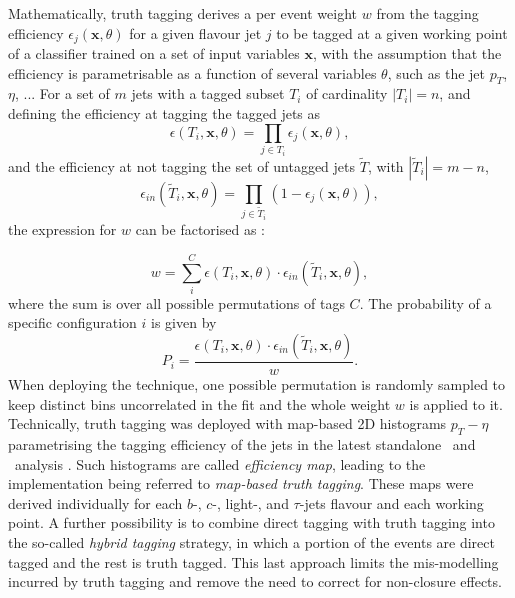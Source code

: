 Mathematically, truth tagging derives a per event weight $w$ from the tagging efficiency $\epsilon_j(\textbf{x}, \theta)$ for a given flavour jet $j$ to be tagged at a given working point of a classifier trained on a set of input variables $\textbf{x}$, with the assumption that the efficiency is parametrisable as a function of several variables $\theta$, such as the jet $p_T$, $\eta$, ... For a set of $m$ jets with a tagged subset $T_i$ of cardinality $|T_i| = n$, and defining the efficiency at tagging the tagged jets as \[\epsilon(T_i,\textbf{x},\theta) = \prod_{j\in T_i} \epsilon_j(\textbf{x},\theta),\] and the efficiency at not tagging the set of untagged jets $\tilde{T}$, with $|\tilde{T}_i| = m-n$, \[ \epsilon_{in}(\tilde{T}_i,\textbf{x}, \theta) = \prod_{j\in \tilde{T}_i} (1-\epsilon_j(\textbf{x}, \theta)),\] the expression for $w$ can be factorised as \cite{ATL-PHYS-PUB-2022-041}: 

\begin{equation}
  \label{eq:truthtagging1}
      w = \sum_i^C \epsilon(T_i,\textbf{x},\theta)\cdot \epsilon_{in}(\tilde{T}_i,\textbf{x},\theta),
  \end{equation}
where the sum is over all possible permutations of tags $C$. The probability of a specific configuration $i$ is given by \[ P_i = \frac{ \epsilon(T_i,\textbf{x},\theta)\cdot \epsilon_{in}(\tilde{T}_i,\textbf{x},\theta)}{w}.\] When deploying the technique, one possible permutation is randomly sampled to keep distinct bins uncorrelated in the fit and the whole weight $w$ is applied to it. \\

Technically, truth tagging was deployed with map-based 2D histograms $p_T - \eta$ parametrising the tagging efficiency of the jets in the latest standalone \vhb\ and \vhc\ analysis \cite{ATLAS:2020fcp, Collaboration:2721696}. Such histograms are called \textit{efficiency map}, leading to the implementation being referred to \textit{map-based truth tagging}. These maps were derived individually for each $b$-, $c$-, light-, and $\tau$-jets flavour and each working point. A further possibility is to combine direct tagging with truth tagging into the so-called \textit{hybrid tagging} strategy, in which a portion of the events are direct tagged and the rest is truth tagged. This last approach limits the mis-modelling incurred by truth tagging and remove the need to correct for non-closure effects. \\

